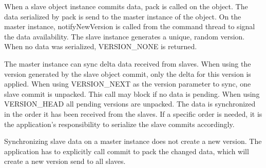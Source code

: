 \documentclass[10pt,a4]{scrartcl}
\begin{document}
When a slave object instance commits data, \textsf{pack} is called on the
object. The data serialized by \textsf{pack} is send to the master instance of
the object. On the master instance, \textsf{notifyNewVersion} is called from the
command thread to signal the data availability. The slave instance generates a
unique, random version. When no data was serialized, \textsf{VERSION\_NONE} is
returned.

The master instance can \textsf{sync} delta data received from slaves. When
using the version generated by the slave object commit, only the delta for this
version is applied. When using \textsf{VERSION\_NEXT} as the version parameter
to \textsf{sync}, one slave commit is unpacked. This call may block if no data
is pending. When using \textsf{VERSION\_HEAD} all pending versions are
unpacked. The data is synchronized in the order it has been received from the
slaves. If a specific order is needed, it is the application's responsibility to
serialize the slave commits accordingly.

Synchronizing slave data on a master instance does not create a new version. The
application has to explicitly call \textsf{commit} to pack the changed data,
which will create a new version send to all slaves.
\end{document}
